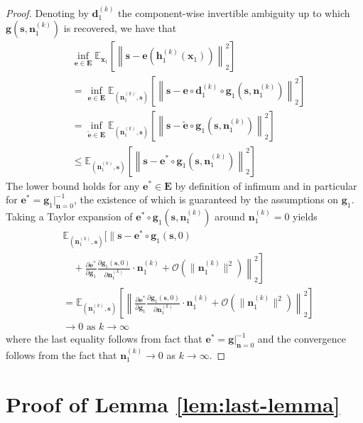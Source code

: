 \begin{proof}
Denoting by $\bm{d}^{(k)}_1$ the component-wise invertible ambiguity up to which $\bm{g}(\bm{s}, \bm{n}_1^{(k)})$ is recovered, we have that
\begin{align}
     &\inf_{\bm{e}\in \bm{E}} \mathbb{E}_{\bm{x}_1} \left[ \left \|\bm{s} - \bm{e}(\bm{h}_1^{(k)}(\bm{x}_1)) \right \|_2^2 \right]\\
    &=\inf_{\bm{e}\in \bm{E}} \mathbb{E}_{(\bm{n}_1^{(k)}, \bm{s})} \left[ \left \|\bm{s} - \bm{e} \circ \bm{d}^{(k)}_1 \circ \bm{g}_1(\bm{s}, \bm{n}_1^{(k)}) \right \|_2^2 \right]\\
    &=\inf_{\tilde{\bm{e}}\in \bm{E}} \mathbb{E}_{(\bm{n}_1^{(k)}, \bm{s})} \left[ \left \|\bm{s} - \tilde{\bm{e}} \circ  \bm{g}_1(\bm{s}, \bm{n}_1^{(k)}) \right \|_2^2 \right]  \\
    &\leq\mathbb{E}_{(\bm{n}_1^{(k)}, \bm{s})} \left[ \left \|\bm{s} - \bm{e^*} \circ  \bm{g}_1(\bm{s}, \bm{n}_1^{(k)}) \right \|_2^2 \right]\label{eq:low_bounded}
\end{align}
The lower bound holds for any $\bm{e^*}\in\bm{E}$ by definition of infimum and in particular for $\bm{e^*} = \bm{g}_1 |^{-1}_{\bm{n}=0}$, the existence of which is guaranteed by the assumptions on $\bm{g}_1$.
Taking a Taylor expansion of $\bm{e^*} \circ  \bm{g}_1(\bm{s}, \bm{n}_1^{(k)})$ around $\bm{n}_1^{(k)}=0$ yields
\begin{align*}
     &\mathbb{E}_{(\bm{n}_1^{(k)}, \bm{s})} \Bigg[  \Bigg\|\bm{s} - \bm{e^*} \circ \bm{g}_1 (\bm{s}, 0) \\
     &\quad+ \left.\left.\frac{\partial \bm{e^*}}{\partial \bm{g}_1} \frac{\partial \bm{g}_1 (\bm{s}, 0)}{\partial \bm{n}_1^{(k)}} \cdot \bm{n}_1^{(k)} + \mathcal{O}(\|\bm{n}_1^{(k)}\|^2) \right \|_2^2 \right]\\
     &=\mathbb{E}_{(\bm{n}_1^{(k)}, \bm{s})} \left[ \left \|\frac{\partial \bm{e^*}}{\partial \bm{g}_1} \frac{\partial \bm{g}_1 (\bm{s}, 0)}{\partial \bm{n}_1^{(k)}} \cdot \bm{n}_1^{(k)} + \mathcal{O}(\|\bm{n}_1^{(k)}\|^2) \right \|_2^2 \right]\\
     &\longrightarrow 0 \text{ as $k \longrightarrow \infty$}
\end{align*}
where the last equality follows from fact that $\bm{e^*} = \bm{g} |^{-1}_{\bm{n}=0}$ and the convergence follows from the fact that $\bm{n}_1^{(k)} \longrightarrow 0$ as $k \to \infty$.
\end{proof}



\section{Proof of Lemma \ref{lem:last-lemma}}
\label{appendix:last-lemma}


